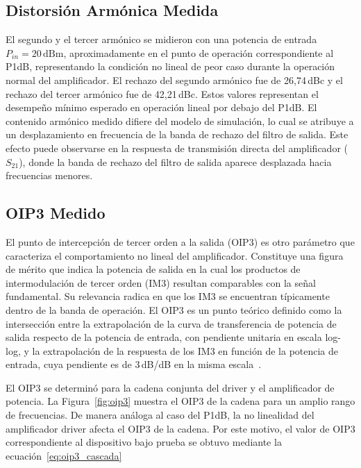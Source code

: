 \subsection{Distorsión Armónica Medida}
El segundo y el tercer armónico se midieron con una potencia de entrada $P_{in} = 20\,\text{dBm}$, aproximadamente en el punto de operación correspondiente al P1dB, representando la condición no lineal de peor caso durante la operación normal del amplificador. El rechazo del segundo armónico fue de 26{,}74\,dBc y el rechazo del tercer armónico fue de 42{,}21\,dBc. Estos valores representan el desempeño mínimo esperado en operación lineal por debajo del P1dB. El contenido armónico medido difiere del modelo de simulación, lo cual se atribuye a un desplazamiento en frecuencia de la banda de rechazo del filtro de salida. Este efecto puede observarse en la respuesta de transmisión directa del amplificador ($S_{21}$), donde la banda de rechazo del filtro de salida aparece desplazada hacia frecuencias menores.

\subsection{OIP3 Medido}
El punto de intercepción de tercer orden a la salida (OIP3) es otro parámetro que caracteriza el comportamiento no lineal del amplificador. Constituye una figura de mérito que indica la potencia de salida en la cual los productos de intermodulación de tercer orden (IM3) resultan comparables con la señal fundamental. Su relevancia radica en que los IM3 se encuentran típicamente dentro de la banda de operación. El OIP3 es un punto teórico definido como la intersección entre la extrapolación de la curva de transferencia de potencia de salida respecto de la potencia de entrada, con pendiente unitaria en escala log-log, y la extrapolación de la respuesta de los IM3 en función de la potencia de entrada, cuya pendiente es de 3\,dB/dB en la misma escala~\cite{Pozar2012}.

El OIP3 se determinó para la cadena conjunta del driver y el amplificador de potencia. La Figura~\ref{fig:oip3} muestra el OIP3 de la cadena para un amplio rango de frecuencias. De manera análoga al caso del P1dB, la no linealidad del amplificador driver afecta el OIP3 de la cadena. Por este motivo, el valor de OIP3 correspondiente al dispositivo bajo prueba se obtuvo mediante la ecuación~\eqref{eq:oip3_cascada}

